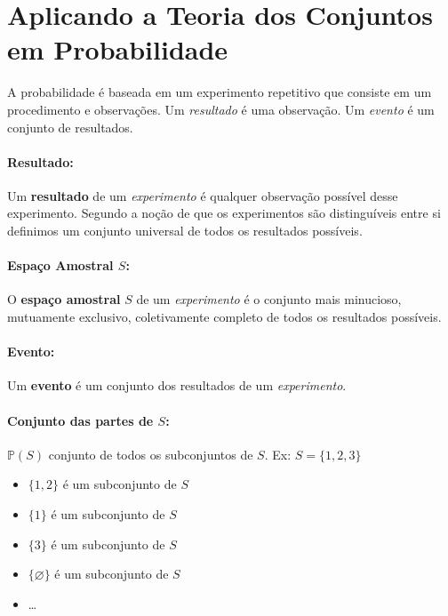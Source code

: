 \documentclass{article}
\renewcommand\bf[1]{\textbf{#1}}
\renewcommand\it[1]{\textit{#1}}
\newcommand{\vn}{\varnothing}
\begin{document}
\setlength{\abovedisplayskip}{12pt}
\setlength{\belowdisplayskip}{12pt}
\setlength{\abovedisplayshortskip}{0pt}
\setlength{\belowdisplayshortskip}{0pt}
\setlength{\jot}{0pt}

\section{Aplicando a Teoria dos Conjuntos em Probabilidade}
A probabilidade é baseada em um experimento repetitivo que consiste em um procedimento e
observações. Um \it{resultado} é uma observação. Um \it{evento} é um conjunto de resultados.

\paragraph{Resultado:}
Um \bf{resultado} de um \it{experimento} é qualquer observação possível desse experimento. Segundo
a noção de que os experimentos são distinguíveis entre si definimos um conjunto universal de todos
os resultados possíveis.

\paragraph{Espaço Amostral $S$:}
O \bf{espaço amostral} $S$ de um \it{experimento} é o conjunto mais minucioso, mutuamente
exclusivo, coletivamente completo de todos os resultados possíveis.

\paragraph{Evento:}
Um \bf{evento} é um conjunto dos resultados de um \it{experimento}.

\paragraph{Conjunto das partes de $S$:}
$\mathbb{P}(S)$ conjunto de todos os subconjuntos de $S$. Ex: $S = \{1,2,3\}$

\begin{itemize}
    \setlength\itemsep{-0.5em}
    \item $\{1,2\}$ é um subconjunto de $S$
    \item $\{1\}$ é um subconjunto de $S$
    \item $\{3\}$ é um subconjunto de $S$
    \item $\{\vn\}$ é um subconjunto de $S$
    \item \ldots
\end{itemize}
\end{document}
